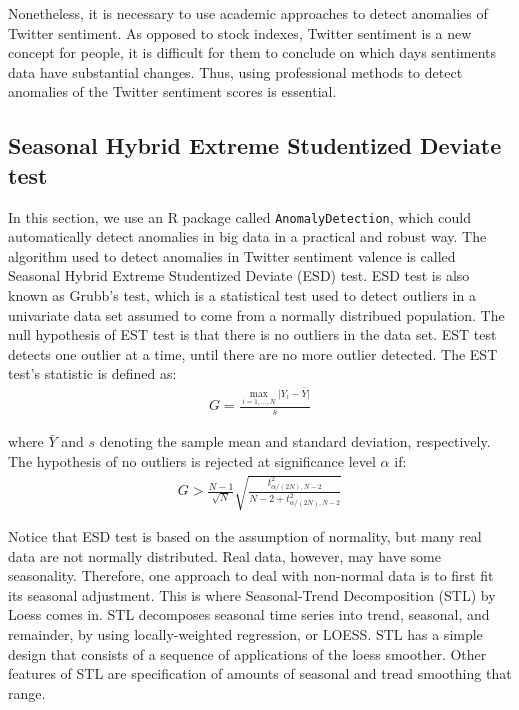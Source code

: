 \documentclass[10pt,letterpaper]{article}
\begin{document}
Nonetheless, it is necessary to use academic approaches to detect anomalies of Twitter sentiment. As opposed to stock indexes, Twitter sentiment is a new concept for people, it is difficult for them to conclude on which days sentiments data have substantial changes. Thus, using professional methods to detect anomalies of the Twitter sentiment scores is essential.


\subsection{Seasonal Hybrid Extreme Studentized Deviate test}
In this section, we use an R package called \texttt{AnomalyDetection}, which could automatically detect anomalies in big data in a practical and robust way. The algorithm used to detect anomalies in Twitter sentiment valence is called Seasonal Hybrid Extreme Studentized Deviate (ESD) test. ESD test is also known as Grubb's test, which is a statistical test used to detect outliers in a univariate data set assumed to come from a normally distribued population. The null hypothesis of EST test is that there is no outliers in the data set. EST test detects one outlier at a time, until there are no more outlier detected. The EST test's statistic is defined as: 
\begin{align}\label{e4}
	G = \frac{\max\limits_{i=1,\ldots,N} \vert Y_i - \bar{Y} \vert} {s}
\end{align}

where $\bar{Y}$ and $s$ denoting the sample mean and standard deviation, respectively. The hypothesis of no outliers is rejected at significance level $\alpha$ if: 
\begin{align}\label{e5}
	G > \frac{N-1}{\sqrt{N}} \sqrt{\frac{t^2_{\alpha/(2N),N-2}}{N-2 + t^2_{\alpha/(2N),N-2}}}
\end{align}



Notice that ESD test is based on the assumption of normality, but many real data are not normally distributed. Real data, however, may have some seasonality. Therefore, one approach to deal with non-normal data is to first fit its seasonal adjustment. This is where Seasonal-Trend Decomposition (STL) by Loess comes in\cite{cleveland1990stl}. STL decomposes seasonal time series into trend, seasonal, and remainder, by using locally-weighted regression, or LOESS. STL has a simple design that consists of a sequence of applications of the loess smoother. Other features of STL are specification of amounts of seasonal and tread smoothing that range. 
\end{document}

